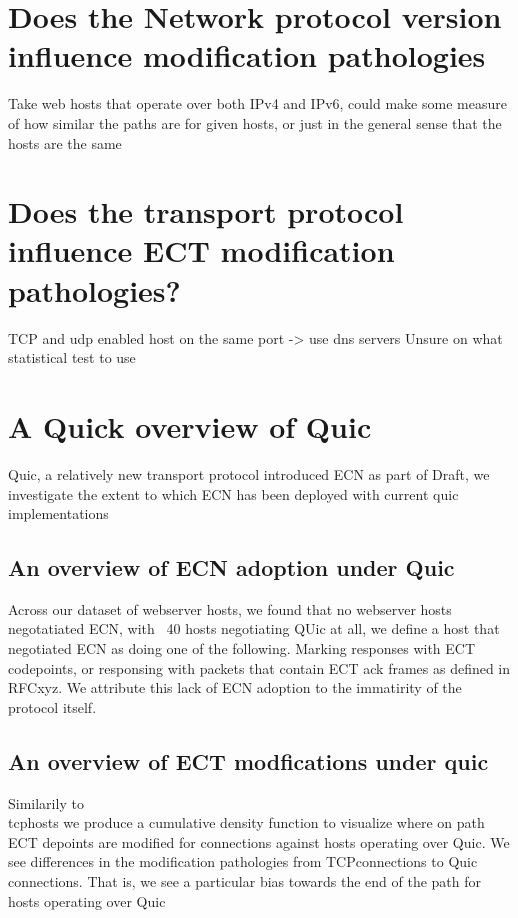 \documentclass{l4proj}
\begin{document}
\section{Does the Network protocol version influence modification pathologies}

Take web hosts that operate over both IPv4 and IPv6, could make some measure of how similar the paths
are for given hosts, or just in the general sense that the hosts are the same


\section{Does the transport protocol influence ECT modification pathologies?}

TCP and udp enabled host on the same port -> use dns servers
Unsure on what statistical test to use


\section{A Quick overview of Quic}

Quic, a relatively new transport protocol introduced ECN as part of Draft, we investigate the extent to which ECN has been deployed with current quic implementations



\subsection{An overview of ECN adoption under Quic}

Across our dataset of webserver hosts, we found that no webserver hosts negotatiated ECN, with ~40 hosts negotiating QUic at all, we define a host that negotiated ECN as doing one of the following. Marking responses with ECT codepoints, or responsing with packets that contain ECT ack frames as defined in RFCxyz. We attribute this lack of ECN adoption to the immatirity of the protocol itself.

\subsection{An overview of ECT modfications under quic}

Similarily to \\tcphosts we produce a cumulative density function to visualize where on path ECT depoints are modified for connections against hosts operating over Quic. We see differences in the modification pathologies from TCPconnections to Quic connections. That is, we see a particular bias towards the end of the path for hosts operating over Quic
\end{document}
